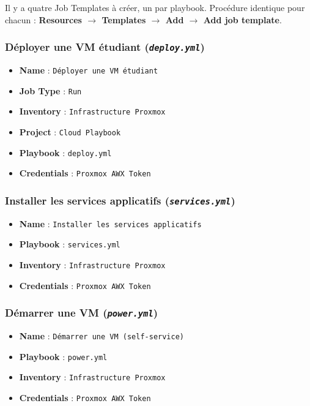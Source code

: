 \documentclass[a4paper]{article}
\newcommand{\cmd}[1]{\texttt{#1}}
\newcommand{\file}[1]{\texttt{\textit{#1}}}
\begin{document}
Il y a quatre Job Templates à créer, un par playbook. Procédure identique pour chacun : \textbf{Resources \(\to\) Templates \(\to\) Add \(\to\) Add job template}.

\subsubsection*{Déployer une VM étudiant (\file{deploy.yml})}

\begin{itemize}
  \item \textbf{Name} : \cmd{Déployer une VM étudiant}
  \item \textbf{Job Type} : \cmd{Run}
  \item \textbf{Inventory} : \cmd{Infrastructure Proxmox}
  \item \textbf{Project} : \cmd{Cloud Playbook}
  \item \textbf{Playbook} : \cmd{deploy.yml}
  \item \textbf{Credentials} : \cmd{Proxmox AWX Token}
\end{itemize}

\subsubsection*{Installer les services applicatifs (\file{services.yml})}

\begin{itemize}
  \item \textbf{Name} : \cmd{Installer les services applicatifs}
  \item \textbf{Playbook} : \cmd{services.yml}
  \item \textbf{Inventory} : \cmd{Infrastructure Proxmox}
  \item \textbf{Credentials} : \cmd{Proxmox AWX Token}
\end{itemize}

\subsubsection*{Démarrer une VM (\file{power.yml})}

\begin{itemize}
  \item \textbf{Name} : \cmd{Démarrer une VM (self-service)}
  \item \textbf{Playbook} : \cmd{power.yml}
  \item \textbf{Inventory} : \cmd{Infrastructure Proxmox}
  \item \textbf{Credentials} : \cmd{Proxmox AWX Token}
\end{itemize}
\end{document}
